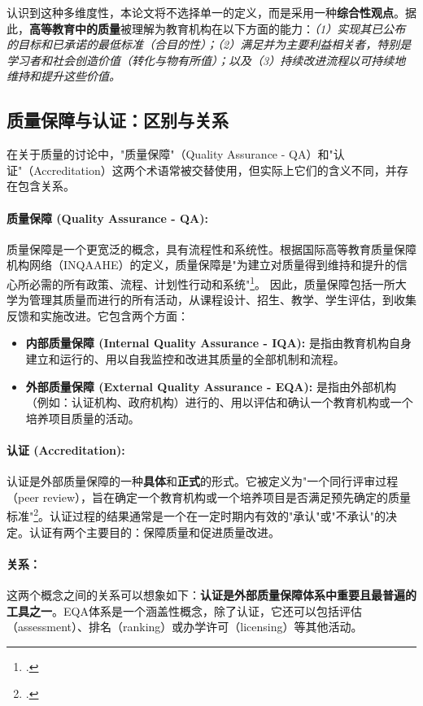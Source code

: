 认识到这种多维度性，本论文将不选择单一的定义，而是采用一种\textbf{综合性观点}。据此，\textbf{高等教育中的质量}被理解为教育机构在以下方面的能力：\textit{（1）实现其已公布的目标和已承诺的最低标准（合目的性）；（2）满足并为主要利益相关者，特别是学习者和社会创造价值（转化与物有所值）；以及（3）持续改进流程以可持续地维持和提升这些价值。}

\subsection{质量保障与认证：区别与关系}
\label{subsec:khai_niem_dbcl_kd}

在关于质量的讨论中，"质量保障"（Quality Assurance - QA）和"认证"（Accreditation）这两个术语常被交替使用，但实际上它们的含义不同，并存在包含关系。

\paragraph{质量保障 (Quality Assurance - QA):}
质量保障是一个更宽泛的概念，具有流程性和系统性。根据国际高等教育质量保障机构网络（INQAAHE）的定义，质量保障是"为建立对质量得到维持和提升的信心所必需的所有政策、流程、计划性行动和系统"\footcite{INQAAHE_Glossary}。
因此，质量保障包括一所大学为管理其质量而进行的所有活动，从课程设计、招生、教学、学生评估，到收集反馈和实施改进。它包含两个方面：
\begin{itemize}
    \item \textbf{内部质量保障 (Internal Quality Assurance - IQA):} 是指由教育机构自身建立和运行的、用以自我监控和改进其质量的全部机制和流程。
    \item \textbf{外部质量保障 (External Quality Assurance - EQA):} 是指由外部机构（例如：认证机构、政府机构）进行的、用以评估和确认一个教育机构或一个培养项目质量的活动。
\end{itemize}

\paragraph{认证 (Accreditation):}
认证是外部质量保障的一种\textbf{具体}和\textbf{正式}的形式。它被定义为"一个同行评审过程（peer review），旨在确定一个教育机构或一个培养项目是否满足预先确定的质量标准"\footcite{CHEA_Definition}。认证过程的结果通常是一个在一定时期内有效的"承认"或"不承认"的决定。认证有两个主要目的：保障质量和促进质量改进。

\paragraph{关系：}
这两个概念之间的关系可以想象如下：\textbf{认证是外部质量保障体系中重要且最普遍的工具之一}。EQA体系是一个涵盖性概念，除了认证，它还可以包括评估（assessment）、排名（ranking）或办学许可（licensing）等其他活动。

